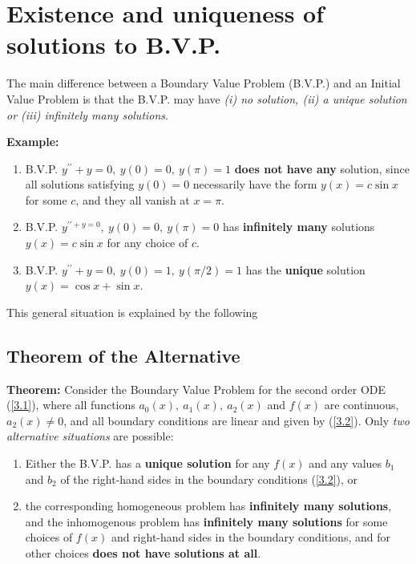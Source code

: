 \documentclass[11pt,a4paper,twoside]{article}
\begin{document}
	\section{Existence and uniqueness of solutions to B.V.P.}
	The main difference between a Boundary Value Problem (B.V.P.) and an Initial Value Problem is that the B.V.P. may have \textit{(i) no solution, (ii) a unique solution or (iii) infinitely many solutions}.\par
	\textbf{Example:}
	\begin{enumerate}
		\item B.V.P. $y^{\prime\prime} + y = 0,\ y(0) = 0,\ y(\pi) = 1$ \textbf{does not have any} solution, since all solutions satisfying $y(0) = 0$ necessarily have the form $y(x) = c \sin x$ for some $c$, and they all vanish at $x = \pi$.
		\item B.V.P. $y^{\prime\prime + y = 0},\ y(0) = 0,\ y(\pi) = 0$ has \textbf{infinitely many} solutions $y(x) = c \sin x$ for any choice of $c$.
		\item B.V.P. $y^{\prime\prime} + y = 0,\ y(0) = 1,\ y(\pi/2) = 1$ has the \textbf{unique} solution $y(x) = \cos x+ \sin x$.	
	\end{enumerate}
	This general situation is explained by the following
	\subsection{Theorem of the Alternative}
	\textbf{Theorem:} Consider the Boundary Value Problem for the second order ODE (\ref{3.1}), where all functions $a_0(x),\ a_1(x),\ a_2(x)$ and $f(x)$ are continuous, $a_2(x) \neq 0$, and all boundary conditions are linear and given by (\ref{3.2}). Only \textit{two alternative situations} are possible:
	\begin{enumerate}
		\item Either the B.V.P. has a \textbf{unique solution} for any $f(x)$ and any values $b_1$ and $b_2$ of the right-hand sides in the boundary conditions (\ref{3.2}), or
		\item the corresponding homogeneous problem has \textbf{infinitely many solutions}, and the inhomogenous problem has \textbf{infinitely many solutions} for some choices of $f(x)$ and right-hand sides in the boundary conditions, and for other choices \textbf{does not have solutions at all}.
	\end{enumerate}
\end{document}
